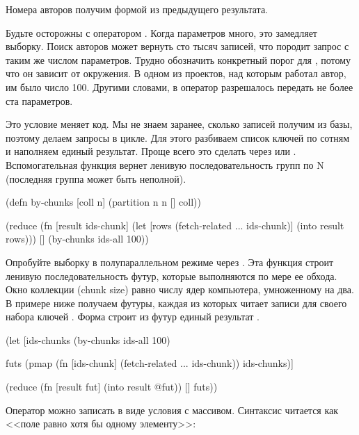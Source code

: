 Номера авторов получим формой  из предыдущего результата.

Будьте осторожны с оператором . Когда параметров много, это замедляет выборку. Поиск авторов может вернуть сто тысяч записей, что породит запрос с таким же числом параметров. Трудно обозначить конкретный порог для , потому что он зависит от окружения. В одном из проектов, над которым работал автор, им было число 100. Другими словами, в оператор  разрешалось передать не более ста параметров.

Это условие меняет код. Мы не знаем заранее, сколько записей получим из базы, поэтому делаем запросы в цикле. Для этого разбиваем список ключей по сотням и наполняем единый результат. Проще всего это сделать через  или . Вспомогательная функция  вернет ленивую последовательность групп по N (последняя группа может быть неполной).

\begin{english}
  \begin{clojure}
(defn by-chunks [coll n]
  (partition n n [] coll))

(reduce
 (fn [result ids-chunk]
   (let [rows (fetch-related ... ids-chunk)]
     (into result rows)))
 []
 (by-chunks ids-all 100))
  \end{clojure}
\end{english}

Опробуйте выборку в полупараллельном режиме через . Эта функция строит ленивую последовательность футур, которые выполняются по мере ее обхода. Окно коллекции (chunk size) равно числу ядер компьютера, умноженному на два. В примере ниже получаем футуры, каждая из которых читает записи для своего набора ключей . Форма  строит из футур единый результат .

\begin{english}
  \begin{clojure/lines}
(let [ids-chunks
      (by-chunks ids-all 100)

      futs
      (pmap (fn [ids-chunk]
              (fetch-related ... ids-chunk))
            ids-chunks)]

  (reduce
   (fn [result fut]
     (into result @fut))
   []
   futs))
  \end{clojure/lines}
\end{english}

Оператор  можно записать в виде условия  с массивом. Синтаксис читается как <<поле  равно хотя бы одному элементу>>:

